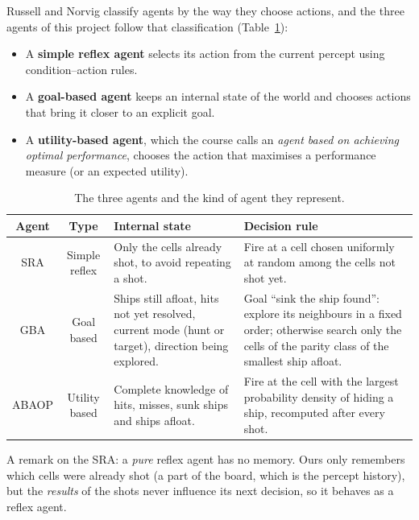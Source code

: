 \documentclass[letterpaper,11pt]{article} %
\renewcommand{\arraystretch}{1.8}
\begin{document}
Russell and Norvig \cite{russell2021} classify agents by the way they choose actions, and the three agents of this project follow that classification (Table~\ref{tab:agenttypes}):

\begin{itemize}
    \item A \textbf{simple reflex agent} selects its action from the current percept using condition--action rules.
    \item A \textbf{goal-based agent} keeps an internal state of the world and chooses actions that bring it closer to an explicit goal.
    \item A \textbf{utility-based agent}, which the course calls an \emph{agent based on achieving optimal performance}, chooses the action that maximises a performance measure (or an expected utility).
\end{itemize}

\begin{table}[H]
    \centering
    \renewcommand{\arraystretch}{1.4}
    \begin{tabular}{|c|c|p{4.2cm}|p{6cm}|}
        \hline
        \rowcolor{blue!20}
        Agent & Type & Internal state & Decision rule \\ \hline
        SRA & Simple reflex & Only the cells already shot, to avoid repeating a shot. & Fire at a cell chosen uniformly at random among the cells not shot yet. \\ \hline
        GBA & Goal based & Ships still afloat, hits not yet resolved, current mode (hunt or target), direction being explored. & Goal ``sink the ship found'': explore its neighbours in a fixed order; otherwise search only the cells of the parity class of the smallest ship afloat. \\ \hline
        ABAOP & Utility based & Complete knowledge of hits, misses, sunk ships and ships afloat. & Fire at the cell with the largest probability density of hiding a ship, recomputed after every shot. \\ \hline
    \end{tabular}
    \caption{The three agents and the kind of agent they represent.}
    \label{tab:agenttypes}
\end{table}

A remark on the SRA: a \emph{pure} reflex agent has no memory. Ours only remembers which cells were already shot (a part of the board, which is the percept history), but the \emph{results} of the shots never influence its next decision, so it behaves as a reflex agent.
\end{document}
